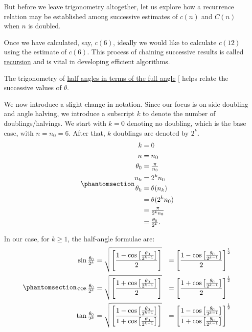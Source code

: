\documentclass[
  a4paper,
]{article}
\begin{document}
But before we leave trigonometry altogether, let us explore how a
recurrence relation may be established among successive estimates of
\(c(n)\) and \(C(n)\) when \(n\) is doubled.

Once we have calculated, say, \(c(6)\), ideally we would like to
calculate \(c(12)\) using the estimate of \(c(6)\). This process of
chaining successive results is called
\href{https://www.geeksforgeeks.org/introduction-to-recursion-2/}{recursion}
and is vital in developing efficient algorithms.

The trigonometry of
\href{https://math.libretexts.org/Bookshelves/Algebra/Algebra_and_Trigonometry_1e_(OpenStax)/09:_Trigonometric_Identities_and_Equations/9.03:_Double-Angle_Half-Angle_and_Reduction_Formulas}{half
angles in terms of the full angle} {[}\citeproc{ref-half-angle}{1}{]}
helps relate the successive values of \(\theta\).

We now introduce a slight change in notation. Since our focus is on side
doubling and angle halving, we introduce a subscript \(k\) to denote the
number of doublings/halvings. We start with \(k = 0\) denoting no
doubling, which is the base case, with \(n = n_{0} = 6\). After that,
\(k\) doublings are denoted by \(2^{k}\).
\begin{equation}\phantomsection\label{eq:base-case}{
\begin{aligned}
k &= 0\\
n &= n_{0}\\
\theta_{0} &= \tfrac{\pi}{n_{0}}\\
n_{k} &= 2^{k}n_{0}\\
\theta_{k} &= \theta(n_{k})\\
&= \theta(2^{k}n_{0})\\
&= \tfrac{\pi}{2^{k}n_{0}}\\ 
&= \tfrac{\theta_{0}}{2^k}.\\
\end{aligned}
}\end{equation}

In our case, for \(k\geq 1\), the half-angle formulae are:
\begin{equation}\phantomsection\label{eq:trig-half-angle}{\begin{aligned}
\sin\tfrac{\theta_{0}}{2^{k}} %
&= \sqrt{\left[\frac{1-\cos\left[\frac{\theta_{0}}{2^{k-1}}\right]}{2}\right]} %
&= \left[\frac{1-\cos\left[\frac{\theta_{0}}{2^{k-1}}\right]}{2}\right]^{\frac{1}{2}}\\
%
\cos\tfrac{\theta_{0}}{2^{k}} %
&= \sqrt{\left[\frac{1+\cos\left[\frac{\theta_{0}}{2^{k-1}}\right]}{2}\right]} %
&= \left[\frac{1+\cos\left[\frac{\theta_{0}}{2^{k-1}}\right]}{2}\right]^{\frac{1}{2}}\\
%
\tan\tfrac{\theta_{0}}{2^{k}} %
&= \sqrt{\left[\frac{1-\cos\left[\frac{\theta_{0}}{2^{k-1}}\right]}{1+\cos\left[\frac{\theta_{0}}{2^{k-1}}\right]}\right]} %
&= \left[\frac{1-\cos\left[\frac{\theta_{0}}{2^{k-1}}\right]}{1+\cos\left[\frac{\theta_{0}}{2^{k-1}}\right]}\right]^{\frac{1}{2}}\\
\end{aligned}
}\end{equation}
\end{document}
